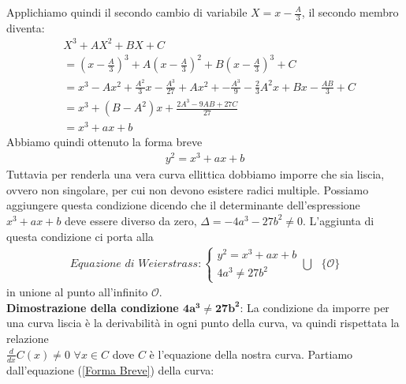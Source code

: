 \documentclass[a4paper,12pt]{tesiinfo}
\newcommand\ddfrac[2]{\frac{\displaystyle #1}{\displaystyle #2}}
\begin{document}
Applichiamo quindi il secondo cambio di variabile $X = x - \ddfrac{A}{3}$, il secondo membro diventa:
\begin{align*}
&X^3 + AX^2 + BX + C 
\\
&=\left(x- \ddfrac{A}{3} \right )^3 +A\left ( x - \ddfrac{A}{3} \right )^2 + B\left (x - \ddfrac{A}{3} \right )^3 +C
\\
&= x^3-Ax^2 + \ddfrac{A^2}{3}x - \ddfrac{A^3}{27} + Ax^2 + - \ddfrac{A^3}{9} -\ddfrac{2}{3}A^2x + Bx - \ddfrac{AB}{3} +C
\\
&= x^3 + (B-A^2)x + \ddfrac{2A^3-9AB+27C}{27}
\\
&= x^3 + ax+b
\end{align*}
Abbiamo quindi ottenuto la forma breve
\begin{gather}
y^2 = x^3 + ax+b
\label{Forma Breve}
\end{gather}
Tuttavia per renderla una vera curva ellittica dobbiamo imporre che sia liscia, ovvero non singolare, per cui non devono esistere radici multiple. Possiamo aggiungere questa condizione dicendo che il determinante dell'espressione $x^3 + ax+b$ deve essere diverso da zero, $\Delta = -4a^3 - 27b^2 \ne 0$. L'aggiunta di questa condizione ci porta alla
\begin{gather}
\textit{Equazione di Weierstrass}:
\begin{cases}
y^2 = x^3 + ax+b\\
4a^3 \ne 27b^2
\end{cases}
\bigcup \text{ } \{\mathcal{O}\}
\label{CE}
\end{gather}
in unione al punto all'infinito $\mathcal{O}$.
\\
\textbf{Dimostrazione della condizione $\mathbold{4a^3 \ne 27b^2}$}: La condizione da imporre per una curva liscia \`e la derivabilit\`a in ogni punto della curva, va quindi rispettata la relazione\\ $\ddfrac{d}{dx}C(x) \ne 0$ $ \forall x \in C$ dove $C$ \`e l'equazione della nostra curva. Partiamo dall'equazione (\ref{Forma Breve}) della curva: 
\end{document}
